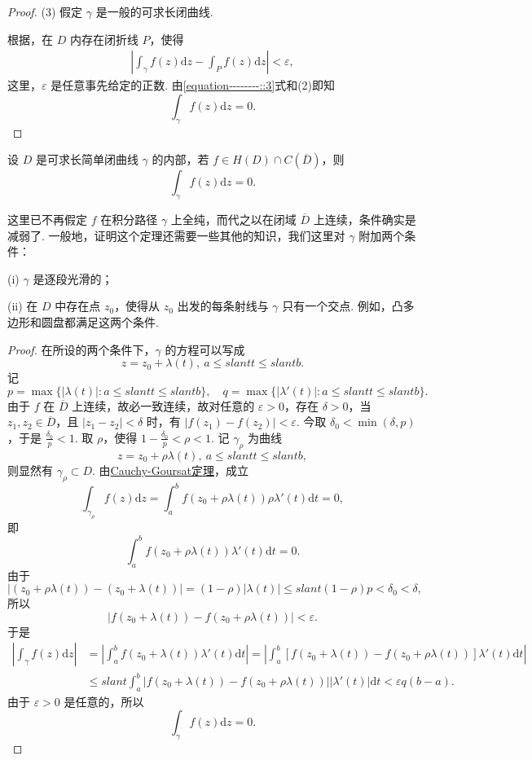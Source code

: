 \documentclass[../../main.tex]{subfiles}
\begin{document}
\begin{proof}
(3) 假定 \( \gamma \) 是一般的可求长闭曲线.

根据，在 \( D \) 内存在闭折线 \( P \)，使得
\begin{align}\label{equation--------::3}
\left| \int_\gamma f(z)\mathrm{d}z - \int_P f(z)\mathrm{d}z \right| < \varepsilon,
\end{align}
这里，\( \varepsilon \) 是任意事先给定的正数. 由\eqref{equation--------::3}式和(2)即知
\[
\int_\gamma f(z)\mathrm{d}z = 0.
\]
\end{proof}

\begin{theorem}\label{theorem:定理3.2.4}
设 \( D \) 是可求长简单闭曲线 \( \gamma \) 的内部，若 \( f \in H(D) \cap C(\overline{D}) \)，则
\[
\int_\gamma f(z)\mathrm{d}z = 0.
\]
\end{theorem}
\begin{remark}
这里已不再假定 \( f \) 在积分路径 \( \gamma \) 上全纯，而代之以在闭域 \( \overline{D} \) 上连续，条件确实是减弱了. 一般地，证明这个定理还需要一些其他的知识，我们这里对 \( \gamma \) 附加两个条件：

(i) \( \gamma \) 是逐段光滑的；

(ii) 在 \( D \) 中存在点 \( z_0 \)，使得从 \( z_0 \) 出发的每条射线与 \( \gamma \) 只有一个交点. 例如，凸多边形和圆盘都满足这两个条件.
\end{remark}
\begin{proof}
在所设的两个条件下，\( \gamma \) 的方程可以写成
\[
z = z_0 + \lambda(t),\ a \leqslant slant t \leqslant slant b.
\]
记
\[
p = \max\{ |\lambda(t)| : a \leqslant slant t \leqslant slant b \},
\quad
q = \max\{ |\lambda'(t)| : a \leqslant slant t \leqslant slant b \}.
\]
由于 \( f \) 在 \( \overline{D} \) 上连续，故必一致连续，故对任意的 \( \varepsilon > 0 \)，存在 \( \delta > 0 \)，当 \( z_1, z_2 \in \overline{D} \)，且 \( |z_1 - z_2| < \delta \) 时，有 \( |f(z_1) - f(z_2)| < \varepsilon \). 今取 \( \delta_0 < \min(\delta, p) \)，于是 \( \frac{\delta_0}{p} < 1 \). 取 \( \rho \)，使得 \( 1 - \frac{\delta_0}{p} < \rho < 1 \). 记 \( \gamma_\rho \) 为曲线
\[
z = z_0 + \rho\lambda(t),\ a \leqslant slant t \leqslant slant b,
\]
则显然有 \( \gamma_\rho \subset D \). 由\hyperref[theorem:Cauchy-Goursat定理(Cauchy积分定理)]{Cauchy-Goursat定理}，成立
\[
\int_{\gamma_\rho} f(z)\mathrm{d}z = \int_a^b f(z_0 + \rho\lambda(t))\rho\lambda'(t)\mathrm{d}t = 0,
\]
即
\[
\int_a^b f(z_0 + \rho\lambda(t))\lambda'(t)\mathrm{d}t = 0.
\]
由于
\[
|(z_0 + \rho\lambda(t)) - (z_0 + \lambda(t))| = (1 - \rho)|\lambda(t)|
\leqslant slant (1 - \rho)p
< \delta_0 < \delta,
\]
所以
\[
|f(z_0 + \lambda(t)) - f(z_0 + \rho\lambda(t))| < \varepsilon.
\]
于是
\begin{align*}
\left| \int_\gamma f(z)\mathrm{d}z \right| &= \left| \int_a^b f(z_0 + \lambda(t))\lambda'(t)\mathrm{d}t \right|
= \left| \int_a^b [f(z_0 + \lambda(t)) - f(z_0 + \rho\lambda(t))]\lambda'(t)\mathrm{d}t \right|
\\
&\leqslant slant \int_a^b |f(z_0 + \lambda(t)) - f(z_0 + \rho\lambda(t))||\lambda'(t)|\mathrm{d}t
< \varepsilon q(b - a).
\end{align*}
由于 \( \varepsilon > 0 \) 是任意的，所以
\[
\int_\gamma f(z)\mathrm{d}z = 0.
\]
\end{proof}
\end{document}
